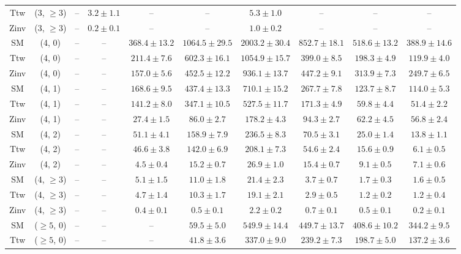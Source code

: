 \begin{table}[h!]
{\begin{tabular}{cccccccccc}
	Ttw & (3, $\ge3$) & -- & $3.2\pm 1.1$ & -- & -- & $5.3\pm 1.0$ & -- & -- & -- \\[0.5ex] 
	Zinv & (3, $\ge3$) & -- & $0.2\pm 0.1$ & -- & -- & $1.0\pm 0.2$ & -- & -- & -- \\[0.5ex] 
	SM & (4, 0) & -- & -- & $368.4\pm 13.2$ & $1064.5\pm 29.5$ & $2003.2\pm 30.4$ & $852.7\pm 18.1$ & $518.6\pm 13.2$ & $388.9\pm 14.6$ \\[0.5ex] 
	Ttw & (4, 0) & -- & -- & $211.4\pm 7.6$ & $602.3\pm 16.1$ & $1054.9\pm 15.7$ & $399.0\pm 8.5$ & $198.3\pm 4.9$ & $119.9\pm 4.0$ \\[0.5ex] 
	Zinv & (4, 0) & -- & -- & $157.0\pm 5.6$ & $452.5\pm 12.2$ & $936.1\pm 13.7$ & $447.2\pm 9.1$ & $313.9\pm 7.3$ & $249.7\pm 6.5$ \\[0.5ex] 
	SM & (4, 1) & -- & -- & $168.6\pm 9.5$ & $437.4\pm 13.3$ & $710.1\pm 15.2$ & $267.7\pm 7.8$ & $123.7\pm 8.7$ & $114.0\pm 5.3$ \\[0.5ex] 
	Ttw & (4, 1) & -- & -- & $141.2\pm 8.0$ & $347.1\pm 10.5$ & $527.5\pm 11.7$ & $171.3\pm 4.9$ & $59.8\pm 4.4$ & $51.4\pm 2.2$ \\[0.5ex] 
	Zinv & (4, 1) & -- & -- & $27.4\pm 1.5$ & $86.0\pm 2.7$ & $178.2\pm 4.3$ & $94.3\pm 2.7$ & $62.2\pm 4.5$ & $56.8\pm 2.4$ \\[0.5ex] 
	SM & (4, 2) & -- & -- & $51.1\pm 4.1$ & $158.9\pm 7.9$ & $236.5\pm 8.3$ & $70.5\pm 3.1$ & $25.0\pm 1.4$ & $13.8\pm 1.1$ \\[0.5ex] 
	Ttw & (4, 2) & -- & -- & $46.6\pm 3.8$ & $142.0\pm 6.9$ & $208.1\pm 7.3$ & $54.6\pm 2.4$ & $15.6\pm 0.9$ & $6.1\pm 0.5$ \\[0.5ex] 
	Zinv & (4, 2) & -- & -- & $4.5\pm 0.4$ & $15.2\pm 0.7$ & $26.9\pm 1.0$ & $15.4\pm 0.7$ & $9.1\pm 0.5$ & $7.1\pm 0.6$ \\[0.5ex] 
	SM & (4, $\ge3$) & -- & -- & $5.1\pm 1.5$ & $11.0\pm 1.8$ & $21.4\pm 2.3$ & $3.7\pm 0.7$ & $1.7\pm 0.3$ & $1.6\pm 0.5$ \\[0.5ex] 
	Ttw & (4, $\ge3$) & -- & -- & $4.7\pm 1.4$ & $10.3\pm 1.7$ & $19.1\pm 2.1$ & $2.9\pm 0.5$ & $1.2\pm 0.2$ & $1.2\pm 0.4$ \\[0.5ex] 
	Zinv & (4, $\ge3$) & -- & -- & $0.4\pm 0.1$ & $0.5\pm 0.1$ & $2.2\pm 0.2$ & $0.7\pm 0.1$ & $0.5\pm 0.1$ & $0.2\pm 0.1$ \\[0.5ex] 
	SM & ($\ge5$, 0) & -- & -- & -- & $59.5\pm 5.0$ & $549.9\pm 14.4$ & $449.7\pm 13.7$ & $408.6\pm 10.2$ & $344.2\pm 9.5$ \\[0.5ex] 
	Ttw & ($\ge5$, 0) & -- & -- & -- & $41.8\pm 3.6$ & $337.0\pm 9.0$ & $239.2\pm 7.3$ & $198.7\pm 5.0$ & $137.2\pm 3.6$ \\[0.5ex] 

\end{tabular}}
\end{table}
